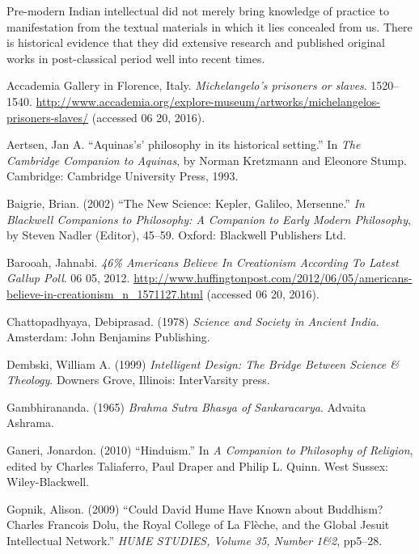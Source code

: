 Pre-modern Indian intellectual did not merely bring knowledge of practice to manifestation from the textual materials in which it lies concealed from us. There is historical evidence that they did extensive research and published original works in post-classical period well into recent times.

\newpage

\begin{thebibliography}{99}
\itemsep=2pt
Accademia Gallery in Florence, Italy. {\sl Michelangelo's prisoners or slaves}. 1520--1540. \url{http://www.accademia.org/explore-museum/artworks/michelangelos-prisoners-slaves/} (accessed 06 20, 2016).

Aertsen, Jan A. ``Aquinas's' philosophy in its historical setting.'' In {\sl The Cambridge Companion to Aquinas}, by Norman Kretzmann and Eleonore Stump. Cambridge: Cambridge University Press, 1993.

Baigrie, Brian. (2002) ``The New Science: Kepler, Galileo, Mersenne.'' {\sl In Blackwell Companions to Philosophy: A Companion to Early Modern Philosophy}, by Steven Nadler (Editor), 45--59. Oxford: Blackwell Publishers Ltd.

Barooah, Jahnabi. {\sl 46\% Americans Believe In Creationism According To Latest Gallup Poll}. 06 05, 2012. \url{http://www.huffingtonpost.com/2012/06/05/americans-believe-in-creationism_n_1571127.html} (accessed 06 20, 2016).

Chattopadhyaya, Debiprasad. (1978) {\sl Science and Society in Ancient India}. Amsterdam: John Benjamins Publishing.

Dembski, William A. (1999) {\sl Intelligent Design: The Bridge Between Science \& Theology}. Downers Grove, Illinois: InterVarsity press.

Gambhirananda. (1965) {\sl Brahma Sutra Bhasya of Sankaracarya}. Advaita Ashrama.

Ganeri, Jonardon. (2010) ``Hinduism.'' In {\sl A Companion to Philosophy of Religion}, edited by Charles Taliaferro, Paul Draper and Philip L. Quinn. West Sussex: Wiley-Blackwell.

Gopnik, Alison. (2009) ``Could David Hume Have Known about Buddhism? Charles Francois Dolu, the Royal College of La Flèche, and the Global Jesuit Intellectual Network.'' {\sl HUME STUDIES, Volume 35, Number 1\&2}, pp5--28.


\end{thebibliography}
